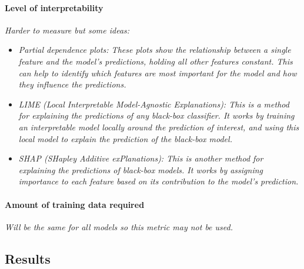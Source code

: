 \paragraph*{Level of interpretability}
\textit{Harder to measure but some ideas: }
\begin{itemize}
    \item \textit{Partial dependence plots: These plots show the relationship between a single feature and the model's predictions, holding all other features constant. This can help to identify which features are most important for the model and how they influence the predictions.}
    \item \textit{LIME (Local Interpretable Model-Agnostic Explanations): This is a method for explaining the predictions of any black-box classifier. It works by training an interpretable model locally around the prediction of interest, and using this local model to explain the prediction of the black-box model.}
    \item \textit{SHAP (SHapley Additive exPlanations): This is another method for explaining the predictions of black-box models. It works by assigning importance to each feature based on its contribution to the model's prediction.}

\end{itemize}


\paragraph*{Amount of training data required}
\textit{Will be the same for all models so this metric may not be used.}

\subsection{Results}

